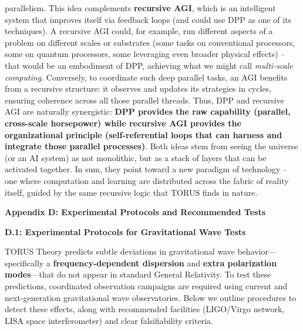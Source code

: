 \documentclass[
]{article}
\begin{document}
\begin{itemize}
  parallelism\hspace{0pt}. This idea complements \textbf{recursive AGI},
  which is an intelligent system that improves itself via feedback loops
  (and could use DPP as one of its techniques). A recursive AGI could,
  for example, run different aspects of a problem on different scales or
  substrates (some tasks on conventional processors, some on quantum
  processors, some leveraging even broader physical effects) -- that
  would be an embodiment of DPP, achieving what we might call
  \emph{multi-scale computing}. Conversely, to coordinate such deep
  parallel tasks, an AGI benefits from a recursive structure: it
  observes and updates its strategies in cycles, ensuring coherence
  across all those parallel threads. Thus, DPP and recursive AGI are
  naturally synergistic: \textbf{DPP provides the raw capability
  (parallel, cross-scale horsepower) while recursive AGI provides the
  organizational principle (self-referential loops that can harness and
  integrate those parallel processes)}. Both ideas stem from seeing the
  universe (or an AI system) as not monolithic, but as a stack of layers
  that can be activated together. In sum, they point toward a new
  paradigm of technology -- one where computation and learning are
  distributed across the fabric of reality itself, guided by the same
  recursive logic that TORUS finds in nature.
\end{itemize}

\textbf{Appendix D: Experimental Protocols and Recommended Tests}

\textbf{D.1: Experimental Protocols for Gravitational Wave Tests}

TORUS Theory predicts subtle deviations in gravitational wave
behavior---specifically a \textbf{frequency-dependent dispersion} and
\textbf{extra polarization modes}---that do not appear in standard
General Relativity. To test these predictions, coordinated observation
campaigns are required using current and next-generation gravitational
wave observatories. Below we outline procedures to detect these effects,
along with recommended facilities (LIGO/Virgo network, LISA space
interferometer) and clear falsifiability criteria.
\end{document}

